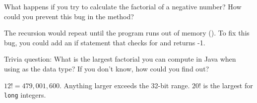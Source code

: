 \Q What happens if you try to calculate the factorial of a negative number?
How could you prevent this bug in the  method?

\begin{answer}
The recursion would repeat until the program runs out of memory ().
To fix this bug, you could add an if statement that checks for  and returns -1.
\end{answer}


\Q Trivia question: What is the largest factorial you can compute in Java when using  as the data type? If you don't know, how could you find out?

\begin{answer}
$12! = 479,001,600$. Anything larger exceeds the 32-bit range. $20!$ is the largest for \texttt{long} integers.
\end{answer}

